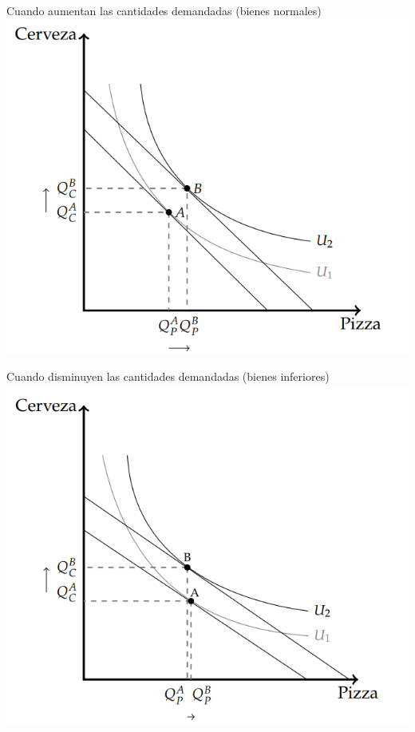 \documentclass{beamer}
\begin{document}
\begin{frame}{Cuando aumentan las cantidades demandadas (bienes normales)}
    \centering
    \includegraphics[scale=0.5]{../Figures/C.8.4.png}
\end{frame}

\begin{frame}{Cuando disminuyen las cantidades demandadas (bienes inferiores)}
    \centering
    \includegraphics[scale=0.5]{../Figures/C.8.5.png}
\end{frame}
\end{document}
